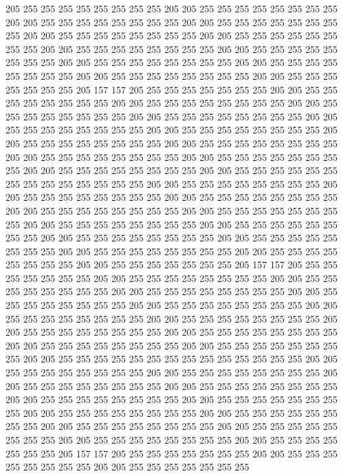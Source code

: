205 255 255 255 255 255 255 255 255 205 205 255 255 255 255 255 255 255 255 205
205 255 255 255 255 255 255 255 255 205 205 255 255 255 255 255 255 255 255 205
205 255 255 255 255 255 255 255 255 205 205 255 255 255 255 255 255 255 255 205
205 255 255 255 255 255 255 255 255 205 205 255 255 255 255 255 255 255 255 205
205 255 255 255 255 255 255 255 255 205 205 255 255 255 255 255 255 255 255 205
205 255 255 255 255 255 255 255 255 205 205 255 255 255 255 255 255 255 205 157
157 205 255 255 255 255 255 255 255 205 205 255 255 255 255 255 255 255 255 205
205 255 255 255 255 255 255 255 255 205 205 255 255 255 255 255 255 255 255 205
205 255 255 255 255 255 255 255 255 205 205 255 255 255 255 255 255 255 255 205
205 255 255 255 255 255 255 255 255 205 205 255 255 255 255 255 255 255 255 205
205 255 255 255 255 255 255 255 255 205 205 255 255 255 255 255 255 255 255 205
205 255 255 255 255 255 255 255 255 205 205 255 255 255 255 255 255 255 255 205
205 255 255 255 255 255 255 255 255 255 255 255 255 255 255 205 205 255 255 255
255 255 255 255 255 205 205 255 255 255 255 255 255 255 255 205 205 255 255 255
255 255 255 255 255 205 205 255 255 255 255 255 255 255 255 205 205 255 255 255
255 255 255 255 255 205 205 255 255 255 255 255 255 255 255 205 205 255 255 255
255 255 255 255 255 205 205 255 255 255 255 255 255 255 255 205 205 255 255 255
255 255 255 255 255 205 205 255 255 255 255 255 255 255 255 205 205 255 255 255
255 255 255 255 255 205 205 255 255 255 255 255 255 255 205 157 157 205 255 255
255 255 255 255 255 205 205 255 255 255 255 255 255 255 255 205 205 255 255 255
255 255 255 255 255 205 205 255 255 255 255 255 255 255 255 205 205 255 255 255
255 255 255 255 255 205 205 255 255 255 255 255 255 255 255 205 205 255 255 255
255 255 255 255 255 205 205 255 255 255 255 255 255 255 255 205 205 255 255 255
255 255 255 255 255 205 205 255 255 255 255 255 255 255 255 205 205 255 255 255
255 255 255 255 255 205 205 255 255 255 255 255 255 255 255 205 205 255 255 255
255 255 255 255 255 255 255 255 255 255 255 205 205 255 255 255 255 255 255 255
255 205 205 255 255 255 255 255 255 255 255 205 205 255 255 255 255 255 255 255
255 205 205 255 255 255 255 255 255 255 255 205 205 255 255 255 255 255 255 255
255 205 205 255 255 255 255 255 255 255 255 205 205 255 255 255 255 255 255 255
255 205 205 255 255 255 255 255 255 255 255 205 205 255 255 255 255 255 255 255
255 205 205 255 255 255 255 255 255 255 255 205 205 255 255 255 255 255 255 255
255 205 205 255 255 255 255 255 255 255 205 157 157 205 255 255 255 255 255 255
255 205 205 255 255 255 255 255 255 255 255 205 205 255 255 255 255 255 255 255
